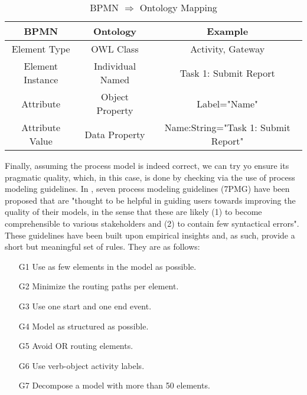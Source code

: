 \documentclass{llncs}
\begin{document}

\begin{table}[h]
	\label{BPMNOntologyMapping}
	\caption{BPMN $\Rightarrow$ Ontology Mapping}
	\centering
	\begin{tabular}{ccc}
		\hline
		BPMN & Ontology & Example \\
		\hline
		Element Type & OWL Class & Activity, Gateway \\
		Element Instance & Individual Named & Task 1: Submit Report \\  
		Attribute & Object Property & Label="Name" \\
		Attribute Value & Data Property & Name:String="Task 1: Submit Report" \\ 
		\hline
	\end{tabular} 
\end{table}


Finally, assuming the process model is indeed correct, we can try yo ensure its pragmatic quality, which, in this case, is done by checking via the use of process modeling guidelines.  In \cite{Mendling2010}, seven process modeling guidelines (7PMG) have been proposed that are "thought to be helpful in guiding users towards improving the quality of their models, in the sense that these are likely (1) to become comprehensible to various stakeholders and (2) to contain few syntactical errors". These guidelines have been built upon empirical insights and, as such, provide a short but meaningful set of rules. They are as follows:
\begin{enumerate}
	\item[G1] Use as few elements in the model as possible.
	\item[G2] Minimize the routing paths per element.
	\item[G3] Use one start and one end event.
	\item[G4] Model as structured as possible. 
	\item[G5] Avoid OR routing elements.
	\item[G6] Use verb-object activity labels.
	\item[G7] Decompose a model with more than 50 elements.
\end{enumerate}
\end{document}

